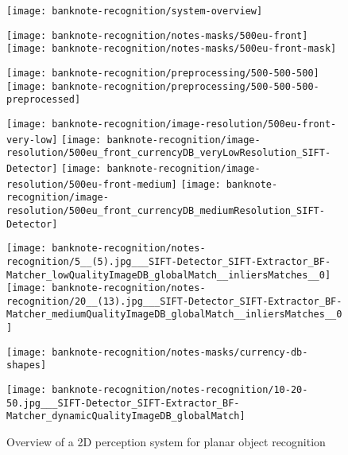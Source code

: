 \begin{figure}[H]
	\centering
	\begin{minipage}[h]{.54\textwidth}
		\centering
		\texttt{[image: banknote-recognition/system-overview]}
	\end{minipage}%
	\begin{minipage}[h]{.26\textwidth}
		\centering
		\vspace*{.37em}
		\texttt{[image: banknote-recognition/notes-masks/500eu-front]}
		\texttt{[image: banknote-recognition/notes-masks/500eu-front-mask]}
		
		\vspace*{0.8em}
		\texttt{[image: banknote-recognition/preprocessing/500-500-500]}
		\texttt{[image: banknote-recognition/preprocessing/500-500-500-preprocessed]}
		
		\vspace*{1.2em}
		\texttt{[image: banknote-recognition/image-resolution/500eu-front-very-low]}\hfill
		\texttt{[image: banknote-recognition/image-resolution/500eu\_front\_currencyDB\_veryLowResolution\_SIFT-Detector]}\hfill
		\texttt{[image: banknote-recognition/image-resolution/500eu-front-medium]}\hfill
		\texttt{[image: banknote-recognition/image-resolution/500eu\_front\_currencyDB\_mediumResolution\_SIFT-Detector]}
		
		\vspace*{.9em}
		\texttt{[image: banknote-recognition/notes-recognition/5\_\_(5).jpg\_\_\_SIFT-Detector\_SIFT-Extractor\_BF-Matcher\_lowQualityImageDB\_globalMatch\_\_inliersMatches\_\_0]}
		\texttt{[image: banknote-recognition/notes-recognition/20\_\_(13).jpg\_\_\_SIFT-Detector\_SIFT-Extractor\_BF-Matcher\_mediumQualityImageDB\_globalMatch\_\_inliersMatches\_\_0]}
		
		\vspace*{.8em}
		\texttt{[image: banknote-recognition/notes-masks/currency-db-shapes]}
		
		\vspace*{.5em}
		\texttt{[image: banknote-recognition/notes-recognition/10-20-50.jpg\_\_\_SIFT-Detector\_SIFT-Extractor\_BF-Matcher\_dynamicQualityImageDB\_globalMatch]}
	\end{minipage}
	\caption[Overview of a 2D perception system for planar object recognition]{Overview of a 2D perception system for planar object recognition \cite{Costa2016ICARSC}}
	\label{fig:banknote-recognition}
\end{figure}

